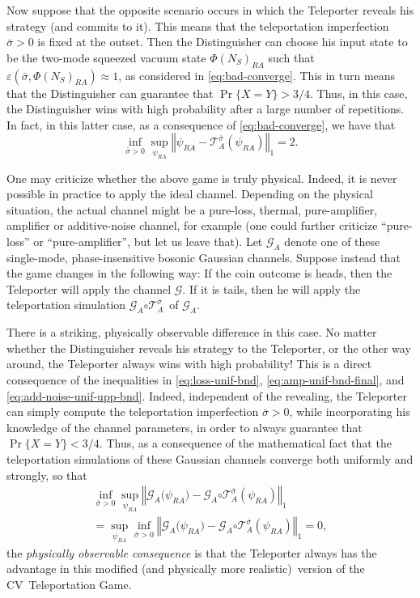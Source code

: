 \documentclass[apsrev,twocolumn]{revtex4-1}%
\begin{document}
Now suppose that the opposite scenario occurs in which the Teleporter reveals
his strategy (and commits to it). This means that the teleportation
imperfection $\bar{\sigma}>0$ is fixed at the outset. Then the Distinguisher
can choose his input state to be the two-mode squeezed vacuum state
$\Phi(N_{S})_{RA}$ such that $\varepsilon(\bar{\sigma},\Phi(N_{S}%
)_{RA})\approx1$, as considered in \eqref{eq:bad-converge}. This in turn means
that the Distinguisher can guarantee that $\Pr\{X=Y\}>3/4$. Thus, in this
case, the Distinguisher wins with high probability after a large number of
repetitions. In fact, in this latter case, as a consequence of
\eqref{eq:bad-converge}, we have that%
\begin{equation}
\inf_{\bar{\sigma}>0}\sup_{\psi_{RA}}\left\Vert \psi_{RA}-\mathcal{T}%
_{A}^{\bar{\sigma}}(\psi_{RA})\right\Vert _{1}=2.
\end{equation}


One may criticize whether the above game is truly physical. Indeed, it is
never possible in practice to apply the ideal channel. Depending on the
physical situation, the actual channel might be a pure-loss, thermal,
pure-amplifier, amplifier or additive-noise channel, for example (one could
further criticize ``pure-loss'' or ``pure-amplifier'', but let us leave that).
Let $\mathcal{G}_{A}$ denote one of these single-mode, phase-insensitive
bosonic Gaussian channels. Suppose instead that the game changes in the
following way: If the coin outcome is heads, then the Teleporter will apply
the channel $\mathcal{G}$. If it is tails, then he will apply the
teleportation simulation $\mathcal{G}_{A}\mathcal{\circ T}_{A}^{\bar{\sigma}%
}$\ of $\mathcal{G}_{A}$.

There is a striking, physically observable difference in this case. No matter
whether the Distinguisher reveals his strategy to the Teleporter, or the other
way around, the Teleporter always wins with high probability! This is a direct
consequence of the inequalities in \eqref{eq:loss-unif-bnd},
\eqref{eq:amp-unif-bnd-final}, and \eqref{eq:add-noise-unif-upp-bnd}. Indeed,
independent of the revealing, the Teleporter can simply compute the
teleportation imperfection $\bar{\sigma}>0$, while incorporating his knowledge
of the channel parameters, in order to always guarantee that $\Pr\{X=Y\}<3/4$.
Thus, as a consequence of the mathematical fact that the teleportation
simulations of these Gaussian channels converge both uniformly and strongly,
so that%
\begin{multline}
\inf_{\bar{\sigma}>0}\sup_{\psi_{RA}}\left\Vert \mathcal{G}_{A}\mathcal{(}%
\psi_{RA})-\mathcal{G}_{A}\mathcal{\circ T}_{A}^{\bar{\sigma}}(\psi
_{RA})\right\Vert _{1}\\
=\sup_{\psi_{RA}}\inf_{\bar{\sigma}>0}\left\Vert \mathcal{G}_{A}%
\mathcal{(}\psi_{RA})-\mathcal{G}_{A}\mathcal{\circ T}_{A}^{\bar{\sigma}}%
(\psi_{RA})\right\Vert _{1}=0,
\end{multline}
the \textit{physically observable consequence} is that the Teleporter always
has the advantage in this modified (and physically more realistic)\ version of
the CV\ Teleportation Game.
\end{document}
